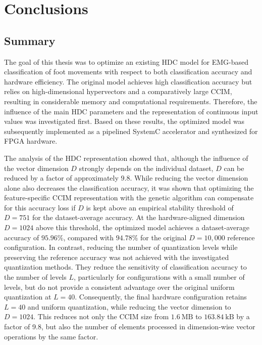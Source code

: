 \chapter{Conclusions}
\section{Summary}
\label{sec:conclusion_summary}

The goal of this thesis was to optimize an existing HDC model for EMG-based classification of foot movements with respect to both classification accuracy and hardware efficiency. The original model achieves high classification accuracy but relies on high-dimensional hypervectors and a comparatively large CCIM, resulting in considerable memory and computational requirements. Therefore, the influence of the main HDC parameters and the representation of continuous input values was investigated first. Based on these results, the optimized model was subsequently implemented as a pipelined SystemC accelerator and synthesized for FPGA hardware.

The analysis of the HDC representation showed that, although the influence of the vector dimension $D$ strongly depends on the individual dataset, $D$ can be reduced by a factor of approximately $9.8$. While reducing the vector dimension alone also decreases the classification accuracy, it was shown that optimizing the feature-specific CCIM representation with the genetic algorithm can compensate for this accuracy loss if $D$ is kept above an empirical stability threshold of $ D= 751$ for the dataset-average accuracy. At the hardware-aligned dimension \(D=1024\) above this threshold, the optimized model achieves a dataset-average accuracy of \(95.96\%\), compared with \(94.78\%\) for the original \(D=10{,}000\) reference configuration. In contrast, reducing the number of quantization levels while preserving the reference accuracy was not achieved with the investigated quantization methods. They reduce the sensitivity of classification accuracy to the number of levels $L$, particularly for configurations with a small number of levels, but do not provide a consistent advantage over the original uniform quantization at $L=40$. Consequently, the final hardware configuration retains $L=40$ and uniform quantization, while reducing the vector dimension to $D=1024$. This reduces not only the CCIM size from $1.6~\mathrm{MB}$ to $163.84~\mathrm{kB}$ by a factor of 9.8, but also the number of elements processed in dimension-wise vector operations by the same factor.

